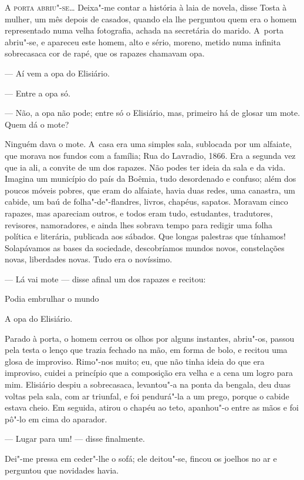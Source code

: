 \begin{linenumbers}

\textsc{A porta abriu"-se}\ldots{} Deixa"-me contar a história à laia de novela, disse
Tosta à mulher, um mês depois de casados, quando ela lhe perguntou quem
era o homem representado numa velha fotografia, achada na secretária do
marido. A~porta abriu"-se, e apareceu este homem, alto e sério, moreno,
metido numa infinita sobrecasaca cor de rapé, que os rapazes chamavam
opa.

--- Aí vem a opa do Elisiário.

--- Entre a opa só.

--- Não, a opa não pode; entre só o Elisiário, mas, primeiro há de glosar
um mote. Quem dá o mote?

Ninguém dava o mote. A~casa era uma simples sala, sublocada por um
alfaiate, que morava nos fundos com a família; Rua do Lavradio, 1866.
Era a segunda vez que ia ali, a convite de um dos rapazes. Não podes ter
ideia da sala e da vida. Imagina um município do país da Boêmia, tudo
desordenado e confuso; além dos poucos móveis pobres, que eram do
alfaiate, havia duas redes, uma canastra, um cabide, um baú de
folha"-de"-flandres, livros, chapéus, sapatos. Moravam cinco rapazes, mas
apareciam outros, e todos eram tudo, estudantes, tradutores, revisores,
namoradores, e ainda lhes sobrava tempo para redigir uma folha política
e literária, publicada aos sábados. Que longas palestras que tínhamos!
Solapávamos as bases da sociedade, descobríamos mundos novos,
constelações novas, liberdades novas. Tudo era o novíssimo.

--- Lá vai mote --- disse afinal um dos rapazes e recitou:

Podia embrulhar o mundo

A opa do Elisiário.

Parado à porta, o homem cerrou os olhos por alguns instantes, abriu"-os,
passou pela testa o lenço que trazia fechado na mão, em forma de bolo, e
recitou uma glosa de improviso. Rimo"-nos muito; eu, que não tinha ideia
do que era improviso, cuidei a princípio que a composição era velha e a
cena um logro para mim. Elisiário despiu a sobrecasaca, levantou"-a na
ponta da bengala, deu duas voltas pela sala, com ar triunfal, e foi
pendurá"-la a um prego, porque o cabide estava cheio. Em seguida, atirou
o chapéu ao teto, apanhou"-o entre as mãos e foi pô"-lo em cima do
aparador.

--- Lugar para um! --- disse finalmente.

Dei"-me pressa em ceder"-lhe o sofá; ele deitou"-se, fincou os joelhos no
ar e perguntou que novidades havia.


\end{linenumbers}

